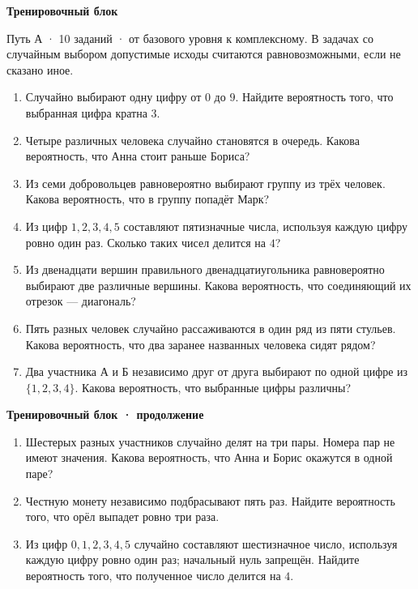 \documentclass[a4paper,12pt]{article}
\begin{document}
{\Large\bfseries\color{darkaccent}Тренировочный блок}\par
\vspace{2mm}
\textcolor{quiet}{Путь А · 10 заданий · от базового уровня к комплексному. В задачах со случайным выбором допустимые исходы считаются равновозможными, если не сказано иное.}
\vspace{2mm}
\begin{enumerate}[label=\textbf{\arabic*.}]
\item Случайно выбирают одну цифру от $0$ до $9$. Найдите вероятность того, что выбранная цифра кратна $3$.

\item Четыре различных человека случайно становятся в очередь. Какова вероятность, что Анна стоит раньше Бориса?

\item Из семи добровольцев равновероятно выбирают группу из трёх человек. Какова вероятность, что в группу попадёт Марк?

\item Из цифр $1,2,3,4,5$ составляют пятизначные числа, используя каждую цифру ровно один раз. Сколько таких чисел делится на $4$?

\item Из двенадцати вершин правильного двенадцатиугольника равновероятно выбирают две различные вершины. Какова вероятность, что соединяющий их отрезок --- диагональ?

\item Пять разных человек случайно рассаживаются в один ряд из пяти стульев. Какова вероятность, что два заранее названных человека сидят рядом?

\item Два участника А и Б независимо друг от друга выбирают по одной цифре из $\{1,2,3,4\}$. Какова вероятность, что выбранные цифры различны?
\end{enumerate}
\clearpage
{\Large\bfseries\color{darkaccent}Тренировочный блок · продолжение}\par
\vspace{4mm}
\begin{enumerate}[label=\textbf{\arabic*.},start=8]
\item Шестерых разных участников случайно делят на три пары. Номера пар не имеют значения. Какова вероятность, что Анна и Борис окажутся в одной паре?

\item Честную монету независимо подбрасывают пять раз. Найдите вероятность того, что орёл выпадет ровно три раза.

\item Из цифр $0,1,2,3,4,5$ случайно составляют шестизначное число, используя каждую цифру ровно один раз; начальный нуль запрещён. Найдите вероятность того, что полученное число делится на $4$.
\end{enumerate}
\clearpage
\end{document}
